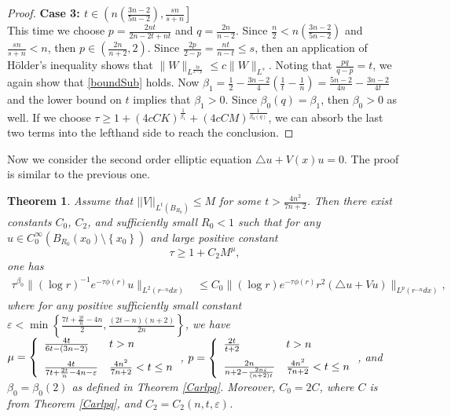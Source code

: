 \documentclass[11pt]{amsart}
\theoremstyle{plain}
\newtheorem{theorem}{Theorem}
\numberwithin{equation}{section}
\begin{document}
\begin{proof}
{\bf Case 3: $t \in {\left( {n{\left( {\frac{3n-2}{5n-2}} \right) }, \frac{sn}{s+n}} \right] }$} \\
This time we choose $p = \frac{2nt}{2n-2t+nt}$ and $q = \frac{2n}{n-2}$.
Since $\frac n 2 < n{\left( {\frac{3n-2}{5n-2}} \right) }$ and $\frac{sn}{s+n} < n$, then $p \in {\left( {\frac{2n}{n+2}, 2} \right) }$.
Since $\frac{2p}{2-p} = \frac{nt}{n-t} \le s$, then an application of H\"older's inequality shows that $\|W\|_{L^{\frac{2p}{2-p}}} \le c \|W\|_{L^{s}}$.
Noting that $\frac{pq}{q-p} = t$, we again show that \eqref{boundSub} holds.
Now ${\beta}_1 = \frac 1 2 - \frac{3n-2}{4}{\left( {\frac 1 t - \frac 1 n} \right) }  = \frac {5n-2}{4n} - \frac{3n-2}{4t}$ and the lower bound on $t$ implies that ${\beta}_1 > 0$.
Since ${\beta}_0{\left( {q} \right) } = {\beta}_1$, then ${\beta}_0 > 0$ as well.
If we choose $\tau \ge 1 + {\left( {4 c C K} \right) }^{\frac 1 {{\beta}_1}} + {\left( {4 c C M} \right) }^{\frac 1 {{\beta}_0{\left( {q} \right) }}}$, we can absorb the last two terms into the lefthand side to reach the conclusion.
\end{proof}

Now we consider the second order elliptic equation $\triangle u+V(x)u=0$.
The proof is similar to the previous one.

\begin{theorem}
Assume that ${\left\vert\left\vert {V}\right\vert\right\vert}_{L^t{\left( {B_{R_0}} \right) }} \le M$ for some $t > \frac{4 n^2}{7n+2}$.
Then there exist constants $C_0$, $C_2$, and sufficiently small $R_0 < 1$  such that for any $u\in C^{\infty}_{0}(B_{R_0}(x_0)\setminus {\left\{{x_0}\right\}})$ and large positive constant
$$\tau \ge 1 + C_2 M^{\mu},$$
one has
\begin{align}
\tau^{{\beta}_0} \|(\log r)^{-1} e^{-\tau \phi(r)}u\|_{L^2(r^{-n}dx)}
&\leq  C_0 \|(\log r ) e^{-\tau \phi(r)} r^2{\left( { \triangle u + V u} \right) }\|_{L^p(r^{-n} dx)} ,
\label{main3}
\end{align}
where for any positive sufficiently small constant ${\varepsilon} <
\min{\left\{{\frac{7t+\frac{2t}n-4n}{2}, \frac{(2t-n)(n+2)}{2n} }\right\}}$, we
have ${\displaystyle} \mu = \left\{\begin{array}{ll}
\frac{4t}{6t - {\left( {3n-2} \right) }} & t > n \medskip \\
\frac{4t} {7t+\frac{2t}n-4n-{\varepsilon}} & \frac{4n^2}{7n+2} < t \le n
\end{array}\right.$,
${\displaystyle} p = \left\{\begin{array}{ll}
\frac{2t}{t+2} & t > n \medskip \\
\frac{2n}{n + 2 -  \frac{2n{\varepsilon}}{{\left( {n+2} \right) }t} }& \frac{4n^2}{7n+2} < t
\le n
\end{array}\right.$,
and ${\beta}_0 = {\beta}_0{\left( {2} \right) }$ as defined in Theorem \ref{Carlpq}.
Moreover, $C_0 = 2 C$, where $C$ is from Theorem \ref{Carlpq}, and $C_2 = C_2{\left( {n,t, {\varepsilon}} \right) }$.
\label{CarlpqV}
\end{theorem}
\end{document}
